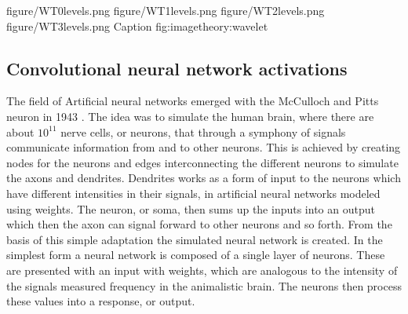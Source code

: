 \fourfigure
{figure/WT0levels.png}
{figure/WT1levels.png}
{figure/WT2levels.png}
{figure/WT3levels.png}
{Caption}
{fig:imagetheory:wavelet} 



\subsection{Convolutional neural network activations}
\label{sec:vgg_feature}

The field of Artificial neural networks emerged with the McCulloch and Pitts neuron in 1943 . The idea was to simulate the human brain, where there are about $10^{11}$ nerve cells, or neurons, that through a symphony of signals communicate information from and to other neurons. This is achieved by creating nodes for the neurons and edges interconnecting the different neurons to simulate the axons and dendrites. Dendrites works as a form of input to the neurons which have different intensities in their signals, in artificial neural networks modeled using weights. The neuron, or soma, then sums up the inputs into an output which then the axon can signal forward to other neurons and so forth. From the basis of this simple adaptation the simulated neural network is created. In the simplest form a neural network is composed of a single layer of neurons. These are presented with an input with weights, which are analogous to the intensity of the signals measured frequency in the animalistic brain. The neurons then process these values into a response, or output.


